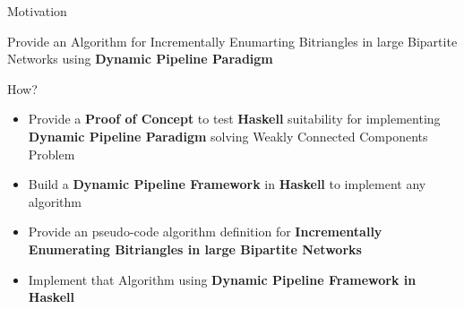 \begin{frame}[fragile]{Motivation}
  \begin{center}
    Provide an Algorithm for Incrementally Enumarting Bitriangles in large Bipartite Networks using \textbf{Dynamic Pipeline Paradigm}
  \end{center}    
  \begin{block}{How?}
    \begin{itemize}
      \item {\color{light}Provide a \textbf{Proof of Concept} to test \textbf{Haskell} suitability for implementing  \textbf{Dynamic Pipeline Paradigm} solving Weakly Connected Components Problem}
      \item {\color{light}Build a \textbf{Dynamic Pipeline Framework} in \textbf{Haskell} to implement any algorithm }
      \item {\color{light}Provide an pseudo-code algorithm definition for \textbf{Incrementally Enumerating Bitriangles in large Bipartite Networks}}
      \item Implement that Algorithm using \textbf{Dynamic Pipeline Framework in Haskell}
  \end{itemize}   
\end{block} 
\end{frame}


